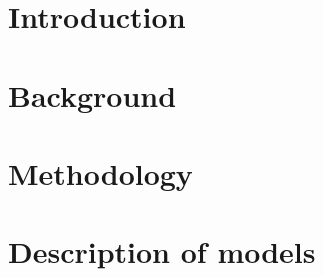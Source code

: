 

\raggedbottom %



\frontmatter	 %


\newpage
\clearpage

\newpage

\tableofcontents*												%

\mainmatter
%


\chapter{Introduction}


\chapter{Background} 




\chapter{Methodology}




\chapter{Description of models}


